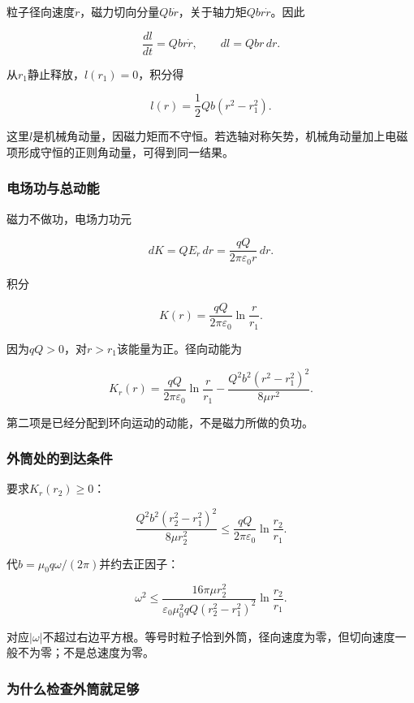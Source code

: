 \documentclass[12pt,a4paper,fontset=fandol]{ctexart}
\begin{document}
粒子径向速度\(\dot r\)，磁力切向分量\(Qb\dot r\)，关于轴力矩\(Qb r\dot r\)。因此

\[
\frac{dl}{dt}=Qb r\dot r,
\qquad dl=Qb r\,dr.
\]

从\(r_1\)静止释放，\(l(r_1)=0\)，积分得

\[
\boxed{l(r)=\frac12Qb(r^2-r_1^2)}.
\]

这里\(l\)是机械角动量，因磁力矩而不守恒。若选轴对称矢势，机械角动量加上电磁项形成守恒的正则角动量，可得到同一结果。

\subsubsection{电场功与总动能}\label{ux7535ux573aux529fux4e0eux603bux52a8ux80fd}

磁力不做功，电场力功元

\[
dK=QE_r\,dr=\frac{qQ}{2\pi\varepsilon_0r}\,dr.
\]

积分

\[
\boxed{K(r)=\frac{qQ}{2\pi\varepsilon_0}\ln\frac r{r_1}}.
\]

因为\(qQ>0\)，对\(r>r_1\)该能量为正。径向动能为

\[
K_r(r)=\frac{qQ}{2\pi\varepsilon_0}\ln\frac r{r_1}
-\frac{Q^2b^2(r^2-r_1^2)^2}{8\mu r^2}.
\]

第二项是已经分配到环向运动的动能，不是磁力所做的负功。

\subsubsection{外筒处的到达条件}\label{ux5916ux7b52ux5904ux7684ux5230ux8fbeux6761ux4ef6}

要求\(K_r(r_2)\geq0\)：

\[
\frac{Q^2b^2(r_2^2-r_1^2)^2}{8\mu r_2^2}
\leq\frac{qQ}{2\pi\varepsilon_0}\ln\frac{r_2}{r_1}.
\]

代\(b=\mu_0q\omega/(2\pi)\)并约去正因子：

\[
\boxed{
\omega^2\leq
\frac{16\pi\mu r_2^2}
{\varepsilon_0\mu_0^2qQ(r_2^2-r_1^2)^2}
\ln\frac{r_2}{r_1}}.
\]

对应\(\lvert\omega\rvert\)不超过右边平方根。等号时粒子恰到外筒，径向速度为零，但切向速度一般不为零；不是总速度为零。

\subsubsection{为什么检查外筒就足够}\label{ux4e3aux4ec0ux4e48ux68c0ux67e5ux5916ux7b52ux5c31ux8db3ux591f}
\end{document}
